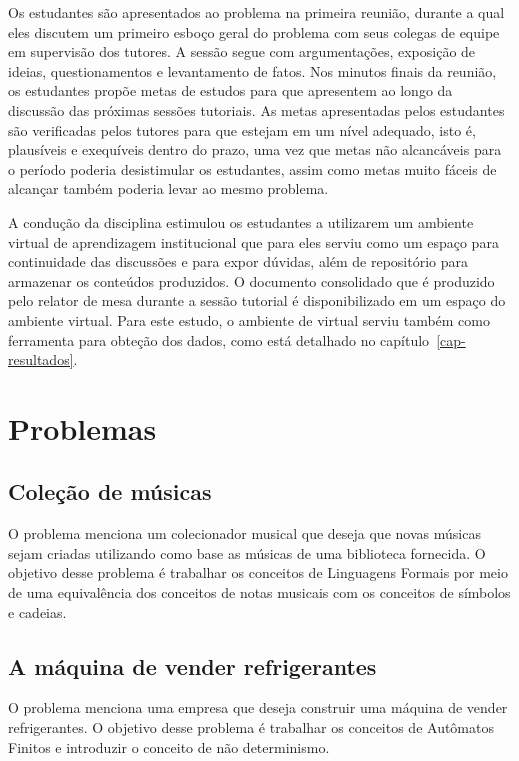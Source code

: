 Os estudantes são apresentados ao problema na primeira reunião, durante
a qual eles discutem um primeiro esboço geral do problema com seus
colegas de equipe em supervisão dos tutores.
A sessão segue com argumentações, exposição de ideias,
questionamentos e levantamento de fatos.
Nos minutos finais da reunião, os estudantes propõe metas de estudos para
que apresentem ao longo da discussão das próximas sessões tutoriais.
As metas apresentadas pelos estudantes são verificadas pelos tutores
para que estejam em um nível adequado, isto é, plausíveis e exequíveis
dentro do prazo, uma vez que metas não
alcancáveis para o período poderia desistimular os estudantes, assim
como metas muito fáceis de alcançar também poderia levar
ao mesmo problema.

A condução da disciplina estimulou os estudantes a
utilizarem um ambiente virtual de aprendizagem
institucional que para eles serviu como um
espaço para continuidade das discussões e para
expor dúvidas, além de repositório para
armazenar os conteúdos produzidos.
O documento consolidado que é produzido pelo relator de mesa
durante a sessão tutorial é disponibilizado em um espaço
do ambiente virtual.
Para este estudo, o ambiente de virtual serviu
também como ferramenta para obteção dos dados,
como está detalhado no
capítulo~\ref{cap-resultados}.

\section{Problemas}

\subsection{Coleção de músicas}
O problema menciona um colecionador musical que deseja que
novas músicas sejam criadas utilizando como base as músicas
de uma biblioteca fornecida.
O objetivo desse problema é trabalhar os conceitos de
Linguagens Formais por meio de uma equivalência dos conceitos
de notas musicais com os conceitos de símbolos e cadeias.

\subsection{A máquina de vender refrigerantes}
O problema menciona uma empresa que deseja construir uma máquina
de vender refrigerantes.
O objetivo desse problema é trabalhar os conceitos de Autômatos
Finitos e introduzir o conceito de não determinismo.

